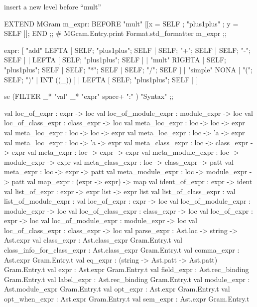 \begin{enumerate}
\begin{enumerate}[(a)]
\begin{itemize}
insert a new level before ``mult'' 
\begin{redcode}
EXTEND MGram  m_expr: BEFORE "mult" [[x = SELF ; "plus1plus" ; y = SELF ]]; END ;;
# MGram.Entry.print Format.std_formatter m_expr ;;
\end{redcode}

\begin{bluecode}
expr: [ "add" LEFTA
  [ SELF; "plus1plus"; SELF
  | SELF; "+"; SELF
  | SELF; "-"; SELF ]
| LEFTA
  [ SELF; "plus1plus"; SELF ]
| "mult" RIGHTA
  [ SELF; "plus1plus"; SELF
  | SELF; "*"; SELF
  | SELF; "/"; SELF ]
| "simple" NONA
  [ "("; SELF; ")"
  | INT ((_)) ]
| LEFTA
  [ SELF; "plus1plus"; SELF ] ]
\end{bluecode}

\begin{redcode}
se (FILTER _* "val" _* "expr" space+ ":" ) "Syntax" ;;
\end{redcode}

\begin{bluecode}
        val loc_of_expr : expr -> loc
        val loc_of_module_expr : module_expr -> loc
        val loc_of_class_expr : class_expr -> loc
                val meta_loc_expr : loc -> loc -> expr
                val meta_loc_expr : loc -> loc -> expr
                val meta_loc_expr : loc -> 'a -> expr
                val meta_loc_expr : loc -> 'a -> expr
                      val meta_class_expr : loc -> class_expr -> expr
                      val meta_expr : loc -> expr -> expr
                      val meta_module_expr : loc -> module_expr -> expr
                      val meta_class_expr : loc -> class_expr -> patt
                      val meta_expr : loc -> expr -> patt
                      val meta_module_expr : loc -> module_expr -> patt
        val map_expr : (expr -> expr) -> map
        val ident_of_expr : expr -> ident
        val list_of_expr : expr -> expr list -> expr list
        val list_of_class_expr :
        val list_of_module_expr :
            val loc_of_expr : expr -> loc
            val loc_of_module_expr : module_expr -> loc
            val loc_of_class_expr : class_expr -> loc
                val loc_of_expr : expr -> loc
                val loc_of_module_expr : module_expr -> loc
                val loc_of_class_expr : class_expr -> loc
        val parse_expr : Ast.loc -> string -> Ast.expr
    val class_expr : Ast.class_expr Gram.Entry.t
    val class_info_for_class_expr : Ast.class_expr Gram.Entry.t
    val comma_expr : Ast.expr Gram.Entry.t
    val eq_expr : (string -> Ast.patt -> Ast.patt) Gram.Entry.t
    val expr : Ast.expr Gram.Entry.t
    val field_expr : Ast.rec_binding Gram.Entry.t
    val label_expr : Ast.rec_binding Gram.Entry.t
    val module_expr : Ast.module_expr Gram.Entry.t
    val opt_expr : Ast.expr Gram.Entry.t
    val opt_when_expr : Ast.expr Gram.Entry.t
    val sem_expr : Ast.expr Gram.Entry.t  
\end{bluecode}


\end{itemize}
\end{enumerate}
\end{enumerate}
